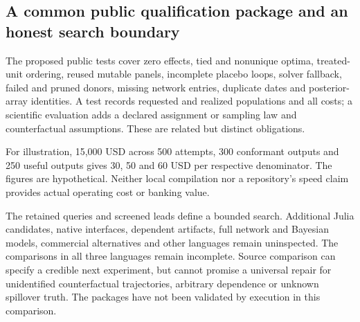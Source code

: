 \subsection{A common public qualification package and an honest search boundary}
The proposed public tests cover zero effects, tied and nonunique optima,
treated-unit ordering, reused mutable panels, incomplete placebo loops,
solver fallback, failed and pruned donors, missing network entries,
duplicate dates and posterior-array identities. A test records requested
and realized populations and all costs; a scientific evaluation adds a
declared assignment or sampling law and counterfactual assumptions.
These are related but distinct obligations.~\citep{exec25_synthcross_choice}

For illustration, 15,000 USD across 500 attempts, 300 conformant outputs
and 250 useful outputs gives 30, 50 and 60 USD per respective denominator.
The figures are hypothetical. Neither local compilation nor a repository's
speed claim provides actual operating cost or banking value.
\citep{exec25_synthcross_choice}

The retained queries and screened leads define a bounded search. Additional
Julia candidates, native interfaces, dependent artifacts, full network and
Bayesian models, commercial alternatives and other languages remain
uninspected. The comparisons in all three languages remain incomplete. Source comparison
can specify a credible next experiment, but cannot promise a universal
repair for unidentified counterfactual trajectories, arbitrary dependence
or unknown spillover truth. The packages have not been validated by execution in this comparison.
\citep{exec25_synthcross_choice}
